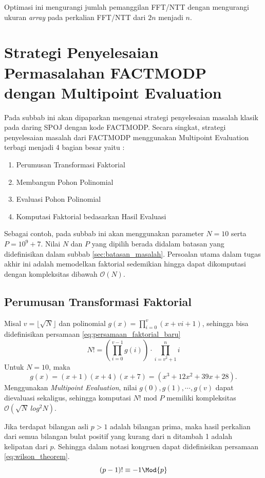 Optimasi ini mengurangi jumlah pemanggilan FFT/NTT dengan mengurangi ukuran \textit{array} pada perkalian FFT/NTT dari $ 2n $ menjadi $ n $.

\section{Strategi Penyelesaian Permasalahan FACTMODP dengan Multipoint Evaluation}
Pada subbab ini akan dipaparkan mengenai strategi penyelesaian masalah klasik pada daring SPOJ dengan kode FACTMODP. Secara singkat, strategi penyelesaian masalah dari FACTMODP menggunakan Multipoint Evaluation terbagi menjadi 4 bagian besar yaitu :
\begin{enumerate}
	\item Perumusan Transformasi Faktorial
	\item Membangun Pohon Polinomial
	\item Evaluasi Pohon Polinomial
	\item Komputasi Faktorial bedasarkan Hasil Evaluasi
\end{enumerate}

Sebagai contoh, pada subbab ini akan menggunakan parameter $ N = 10 $ serta $ P = 10^9 + 7 $. Nilai $ N $ dan $ P $ yang dipilih berada didalam batasan yang didefinisikan dalam subbab \ref{sec:batasan_masalah}. Persoalan utama dalam tugas akhir ini adalah memodelkan faktorial sedemikian hingga dapat dikomputasi dengan kompleksitas dibawah $ \mathcal{O}{(N)} $.

\subsection{Perumusan Transformasi Faktorial}
\label{sec:perumusan_transformasi_faktorial}
Misal $ v = \lfloor \sqrt{N} \rfloor $ dan polinomial $ g(x) = \prod_{i=0}^v (x + vi + 1) $, sehingga bisa didefinisikan persamaan \eqref{eq:persamaan_faktorial_baru}
\begin{equation}
	N ! = \left( \prod_{i=0}^{v-1} g(i) \right) \cdot \prod_{i=v^2+1}^n i
	\label{eq:persamaan_faktorial_baru}
\end{equation}
Untuk $ N = 10 $, maka $$ g(x) = (x+1)(x+4)(x+7) = (x^3 + 12x^2 + 39x + 28). $$
Menggunakan \textit{Multipoint Evaluation}, nilai $ g(0), g(1), \cdots , g(v) $ dapat dievaluasi sekaligus, sehingga komputasi $ N! \text{ mod } P $ memiliki kompleksitas $ \mathcal{O}{(\sqrt{N}\ log^2 N )}. $
\begin{theo}
	\label{theo:wilson}
	Jika terdapat bilangan asli $ p > 1 $ adalah bilangan prima, maka hasil perkalian dari semua bilangan bulat positif yang kurang dari n ditambah 1 adalah kelipatan dari $ p $. Sehingga dalam notasi kongruen dapat didefinisikan persamaan \eqref{eq:wilson_theorem}.
	\begin{equation}
		(p - 1)! \equiv -1 \Mod{p}
		\label{eq:wilson_theorem}
	\end{equation}
\end{theo}



